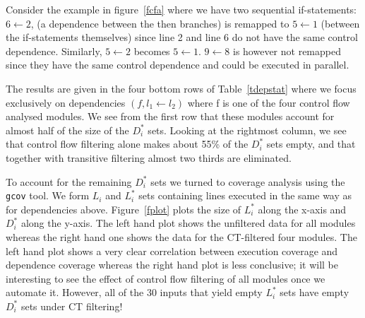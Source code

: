 \documentclass[times, 10pt,twocolumn]{article}
\begin{document}
Consider the example in figure~\ref{fcfa} where we have two 
sequential if-statements: 
$6 \leftarrow 2$, (a 
dependence between the then branches)
is remapped to $5 \leftarrow 1$ (between the if-statements
themselves) since line 2 and line 6 do not have the same control dependence.
Similarly, $5 \leftarrow 2$ becomes $5 \leftarrow 1$.
$9 \leftarrow 8$ is however not remapped since they have the same control
dependence and could be executed in parallel. 

The results are given in the four bottom rows of Table~\ref{tdepstat}
where we focus exclusively on dependencies $(f,l_1 \leftarrow l_2)$ where f is
one of the four control flow analysed 
modules. We see from the first row that these modules
account for almost half of the size of the $D_i^{\ast}$ sets. Looking
at the rightmost column, we see that control flow filtering alone makes
about 55\% of the $D_i^{\ast}$ sets empty, and that together with
transitive filtering almost two thirds are eliminated.


\begin{figure*}
 
\caption{Coverage deltas (x-axis) versus dependence deltas (y-axis)
for no (left) or CT filtering} \label{fplot}
\end{figure*}

To account for the remaining $D_i^{\ast}$ sets we turned to coverage
analysis using the {\tt gcov} tool. We form $L_i$ and $L_i^{\ast}$
sets containing lines executed in the same way as for dependencies
above. Figure~\ref{fplot} plots the size of $L_i^{\ast}$ along the
x-axis and $D_i^{\ast}$ along the y-axis. The left hand plot shows the
unfiltered data for all modules whereas the right hand one shows the
data for the CT-filtered four modules. The left hand plot shows a very
clear correlation between execution coverage and dependence
coverage whereas the right hand plot is less conclusive; it will be
interesting to see the effect of control flow filtering of all
modules once we automate it. 
However, all of the 30 inputs that yield empty $L_i^{\ast}$ sets have 
empty $D_i^{\ast}$ sets under CT filtering!
\end{document}
